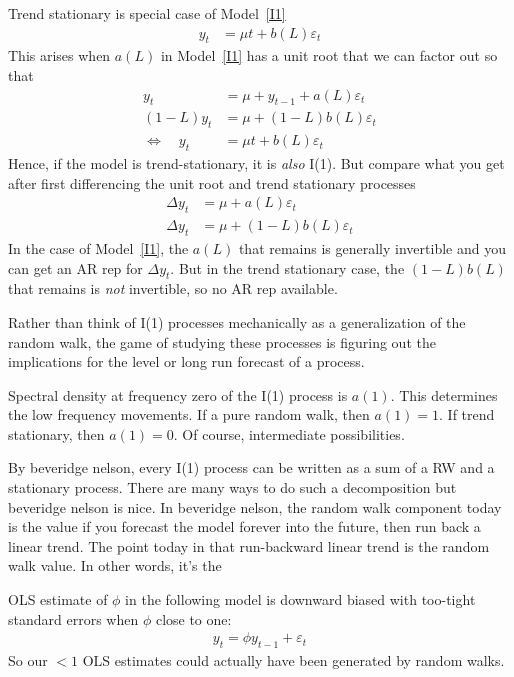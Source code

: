\documentclass[12pt]{article}
\theoremstyle{plain}
\theoremstyle{definition}
\theoremstyle{remark}
\begin{document}
Trend stationary is special case of Model~\ref{I1}
\begin{align*}
  y_t &= \mu t + b(L)\varepsilon_t
\end{align*}
This arises when $a(L)$ in Model~\ref{I1} has a unit root that we can
factor out so that
\begin{align*}
  y_t
  &= \mu + y_{t-1} + a(L)\varepsilon_t
  \\
  (1-L)y_t
  &= \mu + (1-L)b(L)\varepsilon_t
  \\
  \iff\quad
  y_t
  &=
  \mu t
  +
  b(L)\varepsilon_t
\end{align*}
Hence, if the model is trend-stationary, it is \emph{also} I(1).
But compare what you get after first differencing the unit root and
trend stationary processes
\begin{align*}
  \Delta y_t
  &= \mu + a(L)\varepsilon_t\\
  \Delta y_t
  &=
  \mu + (1-L)b(L)\varepsilon_t
\end{align*}
In the case of Model~\ref{I1}, the $a(L)$ that remains is generally
invertible and you can get an AR rep for $\Delta y_t$.
But in the trend stationary case, the $(1-L)b(L)$ that remains is
\emph{not} invertible, so no AR rep available.

Rather than think of I(1) processes mechanically as a generalization of
the random walk, the game of studying these processes is figuring out
the implications for the level or long run forecast of a process.

Spectral density at frequency zero of the I(1) process is $a(1)$.
This determines the low frequency movements.
If a pure random walk, then $a(1)=1$.
If trend stationary, then $a(1)=0$.
Of course, intermediate possibilities.

By beveridge nelson, every I(1) process can be written as a sum of a RW
and a stationary process.
There are many ways to do such a decomposition but beveridge nelson is
nice.
In beveridge nelson, the random walk component today is the value if you
forecast the model forever into the future, then run back a linear
trend. The point today in that run-backward linear trend is the random
walk value.
In other words, it's the

OLS estimate of $\phi$ in the following model is downward biased
with too-tight standard errors when $\phi$ close to one:
\begin{align*}
  y_t = \phi y_{t-1} + \varepsilon_t
\end{align*}
So our $<1$ OLS estimates could actually have been generated by random
walks.
\end{document}
